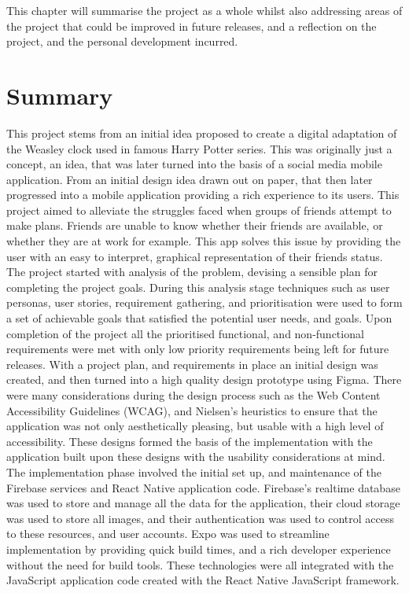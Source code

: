 This chapter will summarise the project as a whole whilst also addressing areas of the project that could be improved in future releases, and a reflection on the project, and the personal development incurred.

\section{Summary}
This project stems from an initial idea proposed to create a digital adaptation of the Weasley clock used in famous Harry Potter series. This was originally just a concept, an idea, that was later turned into the basis of a social media mobile application. From an initial design idea drawn out on paper, that then later progressed into a mobile application providing a rich experience to its users. This project aimed to alleviate the struggles faced when groups of friends attempt to make plans. Friends are unable to know whether their friends are available, or whether they are at work for example. This app solves this issue by providing the user with an easy to interpret, graphical representation of their friends status.\newline\newline
The project started with analysis of the problem, devising a sensible plan for completing the project goals. During this analysis stage techniques such as user personas, user stories, requirement gathering, and prioritisation were used to form a set of achievable goals that satisfied the potential user needs, and goals. Upon completion of the project all the prioritised functional, and non-functional requirements were met with only low priority requirements being left for future releases. \newline\newline  
With a project plan, and requirements in place an initial design was created, and then turned into a high quality design prototype using Figma. There were many considerations during the design process such as the Web Content Accessibility Guidelines (WCAG), and Nielsen's heuristics to ensure that the application was not only aesthetically pleasing, but usable with a high level of accessibility.\newline\newline
These designs formed the basis of the implementation with the application built upon these designs with the usability considerations at mind. The implementation phase involved the initial set up, and maintenance of the Firebase services and React Native application code. Firebase's realtime database was used to store and manage all the data for the application, their cloud storage was used to store all images, and their authentication was used to control access to these resources, and user accounts. Expo was used to streamline implementation by providing quick build times, and a rich developer experience without the need for build tools. These technologies were all integrated with the JavaScript application code created with the React Native JavaScript framework. \newline\newline
